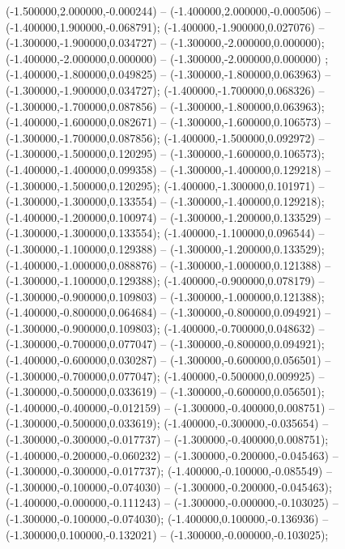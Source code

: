  (-1.500000,2.000000,-0.000244) -- (-1.400000,2.000000,-0.000506) -- (-1.400000,1.900000,-0.068791);
 (-1.400000,-1.900000,0.027076) -- (-1.300000,-1.900000,0.034727) -- (-1.300000,-2.000000,0.000000);
 (-1.400000,-2.000000,0.000000) -- (-1.300000,-2.000000,0.000000) ;
 (-1.400000,-1.800000,0.049825) -- (-1.300000,-1.800000,0.063963) -- (-1.300000,-1.900000,0.034727);
 (-1.400000,-1.700000,0.068326) -- (-1.300000,-1.700000,0.087856) -- (-1.300000,-1.800000,0.063963);
 (-1.400000,-1.600000,0.082671) -- (-1.300000,-1.600000,0.106573) -- (-1.300000,-1.700000,0.087856);
 (-1.400000,-1.500000,0.092972) -- (-1.300000,-1.500000,0.120295) -- (-1.300000,-1.600000,0.106573);
 (-1.400000,-1.400000,0.099358) -- (-1.300000,-1.400000,0.129218) -- (-1.300000,-1.500000,0.120295);
 (-1.400000,-1.300000,0.101971) -- (-1.300000,-1.300000,0.133554) -- (-1.300000,-1.400000,0.129218);
 (-1.400000,-1.200000,0.100974) -- (-1.300000,-1.200000,0.133529) -- (-1.300000,-1.300000,0.133554);
 (-1.400000,-1.100000,0.096544) -- (-1.300000,-1.100000,0.129388) -- (-1.300000,-1.200000,0.133529);
 (-1.400000,-1.000000,0.088876) -- (-1.300000,-1.000000,0.121388) -- (-1.300000,-1.100000,0.129388);
 (-1.400000,-0.900000,0.078179) -- (-1.300000,-0.900000,0.109803) -- (-1.300000,-1.000000,0.121388);
 (-1.400000,-0.800000,0.064684) -- (-1.300000,-0.800000,0.094921) -- (-1.300000,-0.900000,0.109803);
 (-1.400000,-0.700000,0.048632) -- (-1.300000,-0.700000,0.077047) -- (-1.300000,-0.800000,0.094921);
 (-1.400000,-0.600000,0.030287) -- (-1.300000,-0.600000,0.056501) -- (-1.300000,-0.700000,0.077047);
 (-1.400000,-0.500000,0.009925) -- (-1.300000,-0.500000,0.033619) -- (-1.300000,-0.600000,0.056501);
 (-1.400000,-0.400000,-0.012159) -- (-1.300000,-0.400000,0.008751) -- (-1.300000,-0.500000,0.033619);
 (-1.400000,-0.300000,-0.035654) -- (-1.300000,-0.300000,-0.017737) -- (-1.300000,-0.400000,0.008751);
 (-1.400000,-0.200000,-0.060232) -- (-1.300000,-0.200000,-0.045463) -- (-1.300000,-0.300000,-0.017737);
 (-1.400000,-0.100000,-0.085549) -- (-1.300000,-0.100000,-0.074030) -- (-1.300000,-0.200000,-0.045463);
 (-1.400000,-0.000000,-0.111243) -- (-1.300000,-0.000000,-0.103025) -- (-1.300000,-0.100000,-0.074030);
 (-1.400000,0.100000,-0.136936) -- (-1.300000,0.100000,-0.132021) -- (-1.300000,-0.000000,-0.103025);
